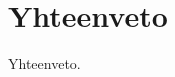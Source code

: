 \documentclass[finnish]{tktltiki2}
\theoremstyle{definition}
\theoremstyle{remark}
\begin{document}
\section{Yhteenveto}

Yhteenveto.


\pagebreak

%
%
% 
%




\lastpage
\end{document}
